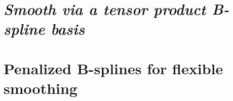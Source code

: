 \documentclass[12pt]{article}
\theoremstyle{definition}
\begin{document}
\section{\emph{Smooth via a tensor product B-spline basis}}
%
%
 

\section{Penalized B-splines for flexible smoothing}

\end{document}
